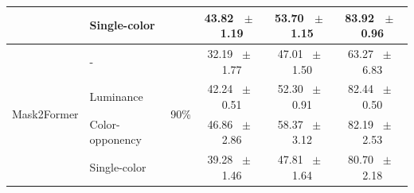 \begin{table}[h]
\begin{tabular}{@{}l l c c c c@{}}
    & Single-color &  & 43.82 ~$\pm$~ 1.19 & 53.70 ~$\pm$~ 1.15 & 83.92 ~$\pm$~ 0.96 \\
    \midrule
    \multirow{4}{*}{Mask2Former} & - & \multirow{4}{*}{90\%} & 32.19 ~$\pm$~ 1.77 & 47.01 ~$\pm$~ 1.50 & 63.27 ~$\pm$~ 6.83 \\
    & Luminance &  & 42.24 ~$\pm$~ 0.51 & 52.30 ~$\pm$~ 0.91 & 82.44 ~$\pm$~ 0.50 \\
    & Color-opponency &  & 46.86 ~$\pm$~ 2.86 & 58.37 ~$\pm$~ 3.12 & 82.19 ~$\pm$~ 2.53 \\
    & Single-color &  & 39.28 ~$\pm$~ 1.46 & 47.81 ~$\pm$~ 1.64 & 80.70 ~$\pm$~ 2.18 \\
    \midrule
    \bottomrule
  \end{tabular}
  \label{tab:mask2former_acdc_snow}
\end{table}